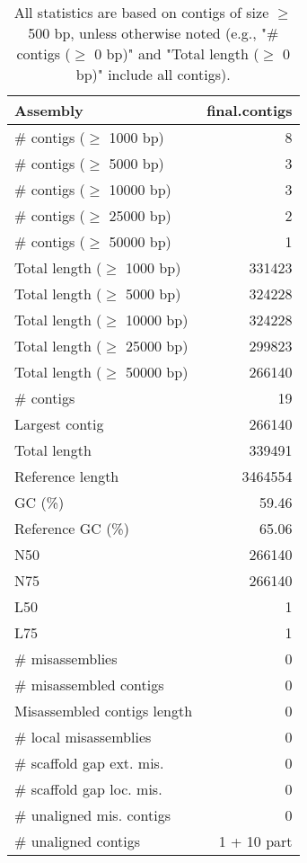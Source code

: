 \documentclass[12pt,a4paper]{article}
\begin{document}
\begin{table}[ht]
\begin{center}
\caption{All statistics are based on contigs of size $\geq$ 500 bp, unless otherwise noted (e.g., "\# contigs ($\geq$ 0 bp)" and "Total length ($\geq$ 0 bp)" include all contigs).}
\begin{tabular}{|l*{1}{|r}|}
\hline
Assembly & final.contigs \\ \hline
\# contigs ($\geq$ 1000 bp) & 8 \\ \hline
\# contigs ($\geq$ 5000 bp) & 3 \\ \hline
\# contigs ($\geq$ 10000 bp) & 3 \\ \hline
\# contigs ($\geq$ 25000 bp) & 2 \\ \hline
\# contigs ($\geq$ 50000 bp) & 1 \\ \hline
Total length ($\geq$ 1000 bp) & 331423 \\ \hline
Total length ($\geq$ 5000 bp) & 324228 \\ \hline
Total length ($\geq$ 10000 bp) & 324228 \\ \hline
Total length ($\geq$ 25000 bp) & 299823 \\ \hline
Total length ($\geq$ 50000 bp) & 266140 \\ \hline
\# contigs & 19 \\ \hline
Largest contig & 266140 \\ \hline
Total length & 339491 \\ \hline
Reference length & 3464554 \\ \hline
GC (\%) & 59.46 \\ \hline
Reference GC (\%) & 65.06 \\ \hline
N50 & 266140 \\ \hline
N75 & 266140 \\ \hline
L50 & 1 \\ \hline
L75 & 1 \\ \hline
\# misassemblies & 0 \\ \hline
\# misassembled contigs & 0 \\ \hline
Misassembled contigs length & 0 \\ \hline
\# local misassemblies & 0 \\ \hline
\# scaffold gap ext. mis. & 0 \\ \hline
\# scaffold gap loc. mis. & 0 \\ \hline
\# unaligned mis. contigs & 0 \\ \hline
\# unaligned contigs & 1 + 10 part \\ \hline

\end{tabular}
\end{center}
\end{table}
\end{document}
